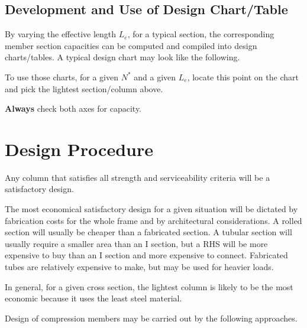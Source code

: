 \subsection{Development and Use of Design Chart/Table}
By varying the effective length $L_e$, for a typical section, the corresponding member section capacities can be computed and compiled into design charts/tables.
A typical design chart may look like the following.
\begin{figure}[H]
\footnotesize\centering

\end{figure}

To use those charts, for a given $N^*$ and a given $L_e$, locate this point on the chart and pick the lightest section/column above.
\begin{figure}[H]
\footnotesize\centering

\end{figure}
\textbf{Always} check both axes for capacity.
\section{Design Procedure}
Any column that satisfies all strength and serviceability criteria will be a satisfactory design.

The most economical satisfactory design for a given situation will be dictated by fabrication costs for the whole frame and by architectural considerations.
A rolled section will usually be cheaper than a fabricated section.
A tubular section will usually require a smaller area than an I section, but a RHS will be more expensive to buy than an I section and more expensive to connect.
Fabricated tubes are relatively expensive to make, but may be used for heavier loads.

In general, for a given cross section, the lightest column is likely to be the most economic because it uses the least steel material.

Design of compression members may be carried out by the following approaches.
